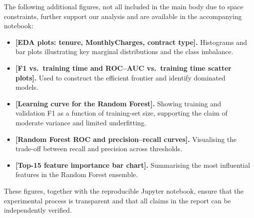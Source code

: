 \documentclass[11pt,a4paper]{article}
\begin{document}
The following additional figures, not all included in the main body due to space constraints, further support our analysis and are available in the accompanying notebook:

\begin{itemize}
    \item \textbf{[EDA plots: tenure, MonthlyCharges, contract type].} Histograms and bar plots illustrating key marginal distributions and the class imbalance.
    \item \textbf{[F1 vs.\ training time and ROC--AUC vs.\ training time scatter plots].} Used to construct the efficient frontier and identify dominated models.
    \item \textbf{[Learning curve for the Random Forest].} Showing training and validation F1 as a function of training-set size, supporting the claim of moderate variance and limited underfitting.
    \item \textbf{[Random Forest ROC and precision--recall curves].} Visualising the trade-off between recall and precision across thresholds.
    \item \textbf{[Top-15 feature importance bar chart].} Summarising the most influential features in the Random Forest ensemble.
\end{itemize}

These figures, together with the reproducible Jupyter notebook, ensure that the experimental process is transparent and that all claims in the report can be independently verified.
\end{document}
